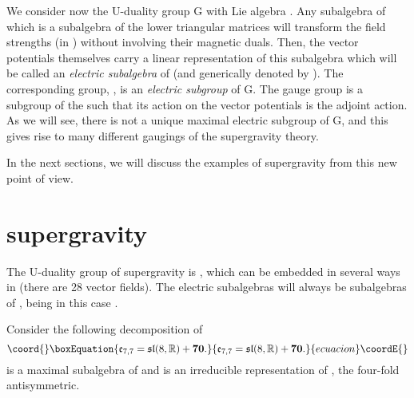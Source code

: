 \documentclass[a4paper,12pt]{article}
\begin{document}
We consider now the U-duality group G with Lie algebra \coordHE{}. Any subalgebra of \myHighlight{$\fg$}\coordHE{} which is a subalgebra of the
lower triangular matrices \coordHE{} will
transform the field strengths (in \coordHE{})  without involving their
magnetic duals. Then, the vector potentials themselves carry a
linear representation of this subalgebra which will be called an
{\it electric subalgebra} of \myHighlight{$\fg$}\coordHE{} (and generically denoted by
\coordHE{}). The corresponding group,
\coordHE{}, is an {\it electric subgroup} of G. The gauge
group  \coordHE{} is a subgroup of the
\coordHE{} such that its action on the vector potentials
is the adjoint action. As we will see, there is not a unique
maximal electric subgroup of G, and this gives rise to many
different gaugings of the supergravity theory.
		
In the next sections, we will discuss the examples of \coordHE{}
supergravity from this new point of view.

\section{\coordHE{} supergravity\label{N=8}}




The U-duality group of \coordHE{} supergravity is \coordHE{}
\cite{cj}, which can be embedded in several ways in \coordHE{}
(there are 28 vector fields). The electric subalgebras will always
be subalgebras of \coordHE{}, being in this case
\coordHE{}.


\bigskip
 Consider the following
decomposition of \coordHE{} \begin{equation}\coord{}\boxEquation{\fe_{7,7}=\fsl(8,\R)
+ \mathbf{70} \label{e77}.}{\fe_{7,7}=\fsl(8,\R)
+ \mathbf{70} .}{ecuacion}\coordE{}\end{equation} \coordHE{} is a maximal
subalgebra of \coordHE{} and \coordHE{} is an irreducible
representation of \coordHE{}, the four-fold antisymmetric.
\end{document}
